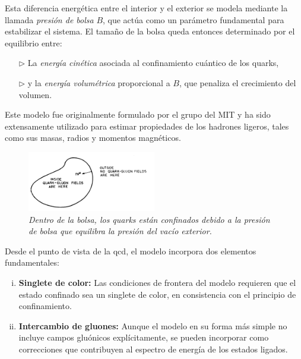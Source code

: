 Esta diferencia energética entre el interior y el exterior se modela mediante la llamada \emph{presión de bolsa} \( B \), que actúa como un parámetro fundamental para estabilizar el sistema. El tamaño de la bolsa queda entonces determinado por el equilibrio entre:

\begin{enumerate}
    \item[$\triangleright$] La \emph{energía cinética} asociada al confinamiento cuántico de los quarks,
    \item[$\triangleright$] y la \emph{energía volumétrica} proporcional a \( B \), que penaliza el crecimiento del volumen.
\end{enumerate}

Este modelo fue originalmente formulado por el grupo del MIT \cite{Chodos_1974} y ha sido extensamente utilizado para estimar propiedades de los hadrones ligeros, tales como sus masas, radios y momentos magnéticos.

\begin{figure}
    \centering
    \includegraphics[width=0.5\textwidth]{./Images/Bag model BC.png}
    \caption[Modelo de bolsa con condiciones de frontera]{\emph{Dentro de la bolsa, los quarks están confinados debido a la presión de bolsa que equilibra la presión del vacío exterior.}}
    \label{fig: Bolsa BC}
\end{figure}

Desde el punto de vista de la \gls{qcd}, el modelo incorpora dos elementos fundamentales:

\begin{enumerate}[i.]
    \item \textbf{Singlete de color:} Las condiciones de frontera del modelo requieren que el estado confinado sea un singlete de color\cite{Han_1965}, en consistencia con el principio de confinamiento.
    \item \textbf{Intercambio de gluones:} Aunque el modelo en su forma más simple no incluye campos gluónicos explícitamente, se pueden incorporar como correcciones que contribuyen al espectro de energía de los estados ligados.
\end{enumerate}

